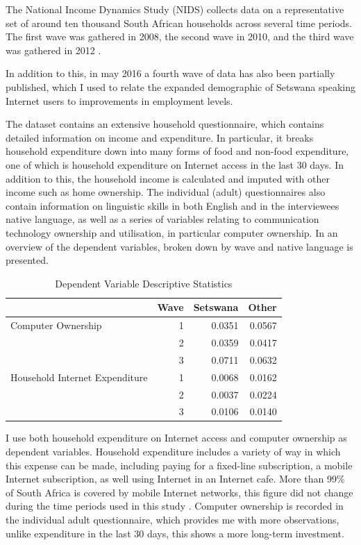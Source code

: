 \documentclass[a4paper,british]{article}\usepackage[]{graphicx}\usepackage[]{color}
\providecommand{\tabularnewline}{\\}
\begin{document}
\label{sec:data}The National Income Dynamics Study (NIDS) collects
data on a representative set of around ten thousand South African
households across several time periods. The first wave was gathered
in 2008, the second wave in 2010, and the third wave was gathered
in 2012 \citep{saldru2008nids,saldru2012nids,saldru2013nids}.

In addition to this, in may 2016 a fourth wave of data has also been
partially published, which I used to relate the expanded demographic
of Setswana speaking Internet users to improvements in employment
levels.

The dataset contains an extensive household questionnaire, which contains
detailed information on income and expenditure. In particular, it
breaks household expenditure down into many forms of food and non-food
expenditure, one of which is household expenditure on Internet access
in the last 30 days. In addition to this, the household income is
calculated and imputed with other income such as home ownership. The
individual (adult) questionnaires also contain information on linguistic
skills in both English and in the interviewees native language, as
well as a series of variables relating to communication technology
ownership and utilisation, in particular computer ownership. In 
an overview of the dependent variables, broken down by wave and native
language is presented.



\begin{table}[H]

\caption{Dependent Variable Descriptive Statistics}

\begin{centering}
\begin{tabular}{|l|r|r|r|}
\hline 
 &
Wave &
Setswana &
Other\tabularnewline
\hline 
\hline 
Computer Ownership &
1 &
0.0351 &
0.0567\tabularnewline
\hline 
 &
2 &
0.0359 &
0.0417\tabularnewline
\hline 
 &
3 &
0.0711 &
0.0632\tabularnewline
\hline 
Household Internet Expenditure &
1 &
0.0068 &
0.0162\tabularnewline
\hline 
 &
2 &
0.0037 &
0.0224\tabularnewline
\hline 
 &
3 &
0.0106 &
0.0140\tabularnewline
\hline 
\end{tabular}
\par\end{centering}
\end{table}

I use both household expenditure on Internet access and computer ownership
as dependent variables. Household expenditure includes a variety of
way in which this expense can be made, including paying for a fixed-line
subscription, a mobile Internet subscription, as well using Internet
in an Internet cafe. More than 99\% of South Africa is covered by
mobile Internet networks, this figure did not change during the time
periods used in this study \citep{international2015world}. Computer
ownership is recorded in the individual adult questionnaire, which
provides me with more observations, unlike expenditure in the last
30 days, this shows a more long-term investment.
\end{document}
